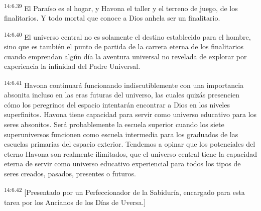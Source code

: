 \par
\textsuperscript{14:6.39} El Paraíso es el hogar, y Havona el taller y el terreno de juego, de los finalitarios. Y todo mortal que conoce a Dios anhela ser un finalitario.

\par
\textsuperscript{14:6.40} El universo central no es solamente el destino establecido para el hombre, sino que es también el punto de partida de la carrera eterna de los finalitarios cuando emprendan algún día la aventura universal no revelada de explorar por experiencia la infinidad del Padre Universal.

\par
\textsuperscript{14:6.41} Havona continuará funcionando indiscutiblemente con una importancia absonita incluso en las eras futuras del universo, las cuales quizás presencien cómo los peregrinos del espacio intentarán encontrar a Dios en los niveles superfinitos. Havona tiene capacidad para servir como universo educativo para los seres absonitos. Será probablemente la escuela superior cuando los siete superuniversos funcionen como escuela intermedia para los graduados de las escuelas primarias del espacio exterior. Tendemos a opinar que los potenciales del eterno Havona son realmente ilimitados, que el universo central tiene la capacidad eterna de servir como universo educativo experiencial para todos los tipos de seres creados, pasados, presentes o futuros.

\par
\textsuperscript{14:6.42} [Presentado por un Perfeccionador de la Sabiduría, encargado para esta tarea por los Ancianos de los Días de Uversa.]